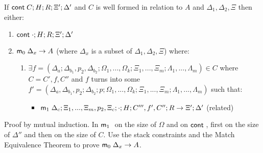 If $\mathsf{cont} \; C; H; R; \Xi'; \Delta'$ and $C$ is well formed in relation to $A$ and $\Delta_1, \Delta_2, \Xi$ then either:\\
\begin{enumerate}
   \item $\mathsf{cont} \; \cdot; H; R; \Xi'; \Delta'$
   \item $\mathsf{m}_0 \; \Delta_x \rightarrow A$ (where $\Delta_x$ is a subset of $\Delta_1, \Delta_2, \Xi$) where:
   \begin{enumerate}
      \item $\exists f = (\Delta_a; \Delta_{b_1}, p_2, \Delta_{b_2}; \Omega_1, ..., \Omega_k; \Xi_1, ..., \Xi_m; \Lambda_1, ..., \Lambda_m) \in C$ where $C = C', f, C''$ and $f$ turns into some $f' = (\Delta_a, \Delta_{b_1}, p_2; \Delta_{b_2}; p; \Omega_1, ..., \Omega_k; \Xi_1, ..., \Xi_m; \Lambda_1, ..., \Lambda_m)$ such that:
         \begin{itemize}
            \item $\mathsf{m}_1 \; \Delta_c; \Xi_1, ..., \Xi_m, p_2, \Xi_c; \cdot; H; C''', f', C''; R \rightarrow \Xi'; \Delta'$ (related)
         \end{itemize}
   \end{enumerate}
\end{enumerate}

Proof by mutual induction. In $\mathsf{m}_1 \;$ on the size of $\Omega$ and on $\mathsf{cont} \;$, first on the size of $\Delta''$ and then on the size of $C$. Use the stack constraints and the Match Equivalence Theorem to prove $\mathsf{m}_0 \; \Delta_x \rightarrow A$.

